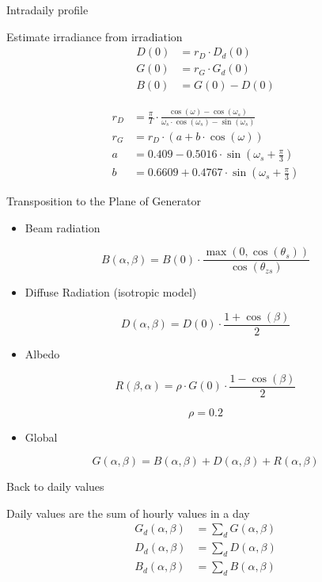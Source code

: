 \documentclass[xcolor={usenames,svgnames,dvipsnames}]{beamer}
\begin{document}
\begin{frame}[label={sec:org1b2f39d}]{Intradaily profile}
\begin{block}{Estimate irradiance from irradiation}
\begin{align*}
  D(0) &= r_D \cdot D_d(0)\\
  G(0) &= r_G \cdot G_d(0)\\
  B(0) &= G(0) - D(0)
\end{align*}

\begin{align*}
  r_{D} &= \frac{\pi}{T}\cdot\frac{\cos(\omega)-\cos(\omega_{s})}{\omega_{s}\cdot\cos(\omega_{s})-\sin(\omega_{s})}\\
  r_{G} &= r_{D}\cdot(a+b\cdot\cos(\omega))\\
  a &= 0.409-0.5016\cdot\sin(\omega_{s}+\frac{\pi}{3})\\
  b &=0.6609+0.4767\cdot\sin(\omega_{s}+\frac{\pi}{3})
\end{align*}
\end{block}
\end{frame}
\begin{frame}[label={sec:orgb8c5c56}]{Transposition to the Plane of Generator}
\begin{itemize}
\item Beam radiation
\end{itemize}

\[B(\alpha,\beta)=B(0)\cdot\frac{\max(0,\cos(\theta_{s}))}{\cos(\theta_{zs})}\]

\begin{itemize}
\item Diffuse Radiation (isotropic model)
\end{itemize}

\[D(\alpha,\beta)=D(0)\cdot\frac{1+\cos(\beta)}{2}\]

\begin{itemize}
\item Albedo
\end{itemize}

\[R(\beta,\alpha)=\rho\cdot G(0)\cdot\frac{1-\cos(\beta)}{2}\]

\[\rho=0.2\]

\begin{itemize}
\item Global
\end{itemize}
\[G(\alpha, \beta) = B(\alpha, \beta) + D(\alpha, \beta) + R(\alpha, \beta)\]
\end{frame}
\begin{frame}[label={sec:orgf50692a}]{Back to daily values}
\begin{block}{Daily values are the sum of hourly values in a day}
\begin{align*}
  G_d(\alpha, \beta) &= \sum_d G(\alpha, \beta)\\
  D_d(\alpha, \beta) &= \sum_d D(\alpha, \beta)\\
  B_d(\alpha, \beta) &= \sum_d B(\alpha, \beta)\\
\end{align*}
\end{block}
\end{frame}
\end{document}
